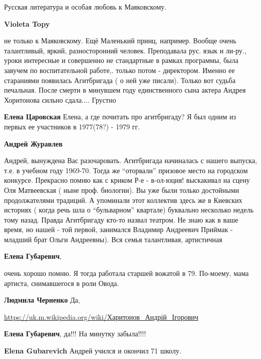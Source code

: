 \begin{itemize}
\begin{itemize} %
Русская литература и особая любовь к Маяковскому.

\begin{itemize} %
\textbf{Violeta Topy} 

не только к Маяковскому. Ещё Маленький принц, например. Вообще очень
талантливый, яркий, разносторонний человек. Преподавала рус. язык и ли-ру., уроки
интересные и совершенно не стандартные в рамках программы, была завучем по
воспитательной работе,. только потом - директором. Именно ее стараниями появилась
Агитбригада ( о ней уже писали). Только вот судьба печальная. После смерти в
минувшем году единственного сына актера Андрея Хоритонова сильно
сдала.... Грустно

\textbf{Елена Царовская} Елена, а где почитать про агитбригаду? Я был одним из первых ее участников в 1977(78?) - 1979 гг.

\textbf{Андрей Журавлев} 

Андрей, вынуждена Вас разочаровать. Агитбригада начиналась с нашего
выпуска, т.е. в учебном году 1969-70. Тогда же \enquote{оторвали} призовое место на
городском конкурсе. Прекрасно помню как с криком Р-е - в-ол-юция! выскакивал на
сцену Оля Матвеевская ( ныне проф. биологии). Вы уже были только достойными
продолжателями традиций. А упоминали этот коллектив здесь же в Киевских
историях ( когда речь шла о \enquote{бульварном} квартале) буквально несколько недель
тому назад. Правда Агитбригаду кто-то назвал театром. Не знаю как в ваше
время, но нашей - той первой, занимался Владимир Андреевич Приймак - младший брат
Ольги Андреевны). Вся семья талантливая, артистичная

\end{itemize} %

\textbf{Елена Губаревич}, 

очень хорошо помню. Я тогда работала старшей вожатой в 79. По-моему, мама
артиста, снимавшегося в роли Овода.

\begin{itemize} %
\textbf{Людмила Черненко} Да,

\url{https://uk.m.wikipedia.org/wiki/Харитонов_Андрій_Ігорович}

\textbf{Елена Губаревич}, да!!! На минутку забыла!!!!

\textbf{Elena Gubarevich} Андрей учился и окончил 71 школу.


\end{itemize}
\end{itemize}
\end{itemize}
